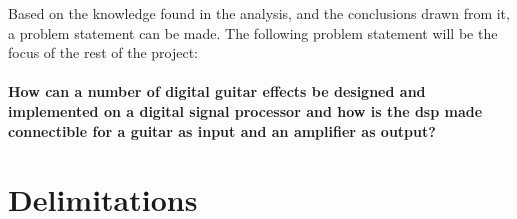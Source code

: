 Based on the knowledge found in the analysis, and the conclusions drawn from it, a problem statement can be made. The following problem statement will be the focus of the rest of the project:
\\
\\
\textbf{How can a number of digital guitar effects be designed and implemented on a digital signal processor and how is the \gls{dsp} made connectible for a guitar as input and an amplifier as output?}
\section{Delimitations}
